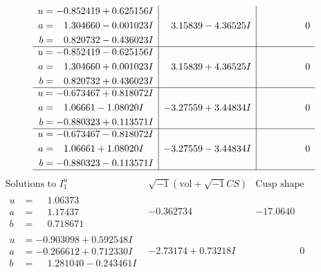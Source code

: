 \documentclass[1p]{elsarticle_modified}
\theoremstyle{definition}
\newcommand{\I}{\sqrt{-1}}
\begin{document}
$$\begin{array}{c|c|c}
\begin{aligned}
u &= -0.852419 + 0.625156 I \\
a &= \phantom{-}1.304660 - 0.001023 I \\
b &= \phantom{-}0.820732 - 0.436023 I\end{aligned}
 & \phantom{-}3.15839 - 4.36525 I & \phantom{-0.000000 } 0 \\ \hline\begin{aligned}
u &= -0.852419 - 0.625156 I \\
a &= \phantom{-}1.304660 + 0.001023 I \\
b &= \phantom{-}0.820732 + 0.436023 I\end{aligned}
 & \phantom{-}3.15839 + 4.36525 I & \phantom{-0.000000 } 0 \\ \hline\begin{aligned}
u &= -0.673467 + 0.818072 I \\
a &= \phantom{-}1.06661 - 1.08020 I \\
b &= -0.880323 + 0.113571 I\end{aligned}
 & -3.27559 + 3.44834 I & \phantom{-0.000000 } 0 \\ \hline\begin{aligned}
u &= -0.673467 - 0.818072 I \\
a &= \phantom{-}1.06661 + 1.08020 I \\
b &= -0.880323 - 0.113571 I\end{aligned}
 & -3.27559 - 3.44834 I & \phantom{-0.000000 } 0\\
 \hline 
 \end{array}$$\newpage$$\begin{array}{c|c|c}  
\text{Solutions to }I^u_{1}& \I (\text{vol} + \sqrt{-1}CS) & \text{Cusp shape}\\
 \hline 
\begin{aligned}
u &= \phantom{-}1.06373\phantom{ +0.000000I} \\
a &= \phantom{-}1.17437\phantom{ +0.000000I} \\
b &= \phantom{-}0.718671\phantom{ +0.000000I}\end{aligned}
 & -0.362734\phantom{ +0.000000I} & -17.0640\phantom{ +0.000000I} \\ \hline\begin{aligned}
u &= -0.903098 + 0.592548 I \\
a &= -0.266612 + 0.712330 I \\
b &= \phantom{-}1.281040 - 0.243461 I\end{aligned}
 & -2.73174 + 0.73218 I & \phantom{-0.000000 } 0 \\ \hline\begin{aligned}

\end{aligned}
\end{array}$$
\end{document}
